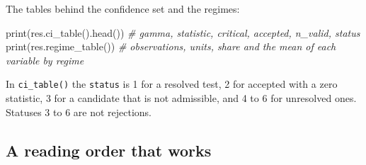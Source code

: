 \documentclass[
  10.5pt,
  a4paper,
]{article}
\newenvironment{Shaded}{}{}
\newcommand{\BuiltInTok}[1]{\textcolor[rgb]{0.00,0.50,0.00}{#1}}
\newcommand{\CommentTok}[1]{\textcolor[rgb]{0.38,0.63,0.69}{\textit{#1}}}
\newcommand{\NormalTok}[1]{#1}
\begin{document}
The tables behind the confidence set and the regimes:

\begin{Shaded}
\begin{Highlighting}[]
\BuiltInTok{print}\NormalTok{(res.ci\_table().head())  }\CommentTok{\# gamma, statistic, critical, accepted, n\_valid, status}
\BuiltInTok{print}\NormalTok{(res.regime\_table())  }\CommentTok{\# observations, units, share and the mean of each variable by regime}
\end{Highlighting}
\end{Shaded}

In \texttt{ci\_table()} the \texttt{status} is 1 for a resolved test, 2
for accepted with a zero statistic, 3 for a candidate that is not
admissible, and 4 to 6 for unresolved ones. Statuses 3 to 6 are not
rejections.

\subsection{A reading order that
works}\label{a-reading-order-that-works}
\end{document}
